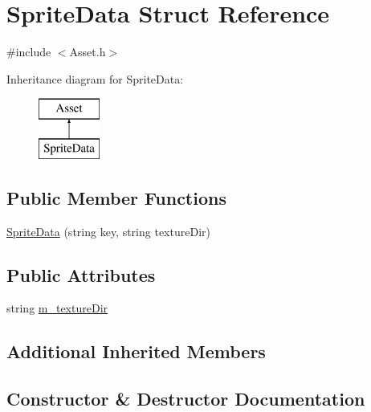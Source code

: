 \hypertarget{struct_sprite_data}{}\section{Sprite\+Data Struct Reference}
\label{struct_sprite_data}


{\ttfamily \#include $<$Asset.\+h$>$}

Inheritance diagram for Sprite\+Data\+:\begin{figure}[H]
\begin{center}
\leavevmode
\includegraphics[height=2.000000cm]{struct_sprite_data}
\end{center}
\end{figure}
\subsection*{Public Member Functions}
\begin{DoxyCompactItemize}
\item 
\hyperlink{struct_sprite_data_a8ee6441f4db31fe212c7dd1aba375586}{Sprite\+Data} (string key, string texture\+Dir)
\end{DoxyCompactItemize}
\subsection*{Public Attributes}
\begin{DoxyCompactItemize}
\item 
string \hyperlink{struct_sprite_data_ad855e92487241140b4e283da7d568863}{m\+\_\+texture\+Dir}
\end{DoxyCompactItemize}
\subsection*{Additional Inherited Members}


\subsection{Constructor \& Destructor Documentation}
\hypertarget{struct_sprite_data_a8ee6441f4db31fe212c7dd1aba375586}{}\label{struct_sprite_data_a8ee6441f4db31fe212c7dd1aba375586} 
